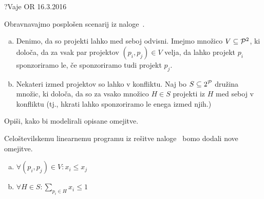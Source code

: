 \begin{naloga}{?}{Vaje OR 16.3.2016}
\begin{vprasanje}
Obravnavajmo posplošen scenarij iz naloge~.
\begin{enumerate}[(a)]
\item Denimo, da so projekti lahko med seboj odvisni.
Imejmo množico $V \subseteq \mathcal{P}^2$, ki določa,
da za vsak par projektov $(p_i, p_j) \in V$ velja,
da lahko projekt $p_i$ sponzoriramo le,
če sponzoriramo tudi projekt $p_j$.

\item Nekateri izmed projektov so lahko v konfliktu.
Naj bo $S \subseteq 2^{\mathcal{P}}$ družina množic, ki določa,
da so za vsako množico $H \in S$ projekti iz $H$ med seboj v konfliktu
(tj., hkrati lahko sponzoriramo le enega izmed njih.)
\end{enumerate}
Opiši, kako bi modelirali opisane omejitve.
\end{vprasanje}

\begin{odgovor}
Celoštevilskemu linearnemu programu iz rešitve naloge~
bomo dodali nove omejitve.
\begin{enumerate}[(a)]
\item $\displaystyle \forall (p_i, p_j) \in V : x_i \le x_j$
\item $\displaystyle \forall H \in S : \sum_{p_i \in H} x_i \le 1$
\end{enumerate}
\end{odgovor}
\end{naloga}


